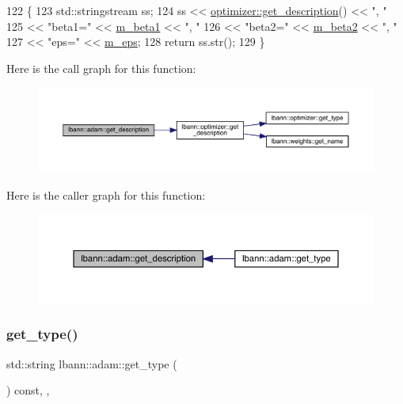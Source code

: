 \begin{DoxyCode}
122                                       \{
123   std::stringstream ss;
124   ss << \hyperlink{classlbann_1_1optimizer_a66bb8d28dfb41452ac1a75a3efd47723}{optimizer::get\_description}() << \textcolor{stringliteral}{", "}
125      << \textcolor{stringliteral}{"beta1="} << \hyperlink{classlbann_1_1adam_a73af15a28066edbfad9ba6a900746a19}{m\_beta1} << \textcolor{stringliteral}{", "}
126      << \textcolor{stringliteral}{"beta2="} << \hyperlink{classlbann_1_1adam_ab1f2a16b8eb7e265895ea9eef3fe87b2}{m\_beta2} << \textcolor{stringliteral}{", "}
127      << \textcolor{stringliteral}{"eps="} << \hyperlink{classlbann_1_1adam_a751102f0fd866612f5685050a08020a9}{m\_eps};
128   \textcolor{keywordflow}{return} ss.str();
129 \}
\end{DoxyCode}
Here is the call graph for this function\+:\nopagebreak
\begin{figure}[H]
\begin{center}
\leavevmode
\includegraphics[width=350pt]{classlbann_1_1adam_a14eb9754e2aa38a732d92b6d42311676_cgraph}
\end{center}
\end{figure}
Here is the caller graph for this function\+:\nopagebreak
\begin{figure}[H]
\begin{center}
\leavevmode
\includegraphics[width=350pt]{classlbann_1_1adam_a14eb9754e2aa38a732d92b6d42311676_icgraph}
\end{center}
\end{figure}
\mbox{\label{classlbann_1_1adam_a091b61b0125d2da89d4029dd30ca1ce7}} 
\subsubsection{\texorpdfstring{get\+\_\+type()}{get\_type()}}
{\footnotesize\ttfamily std\+::string lbann\+::adam\+::get\+\_\+type (\begin{DoxyParamCaption}{ }\end{DoxyParamCaption}) const\hspace{0.3cm}{\ttfamily [inline]}, {\ttfamily [override]}, {\ttfamily [virtual]}}

